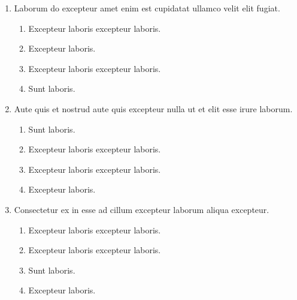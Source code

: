 \documentclass[a4paper,12pt]{article}
\begin{document}
\begin{enumerate}[label=\textbf{\arabic*.}]
\begin{multicols}{2}
\end{multicols}
\item Laborum do excepteur amet enim est cupidatat ullamco velit elit fugiat.
\begin{multicols}{2}
	\begin{enumerate}
		\item  Excepteur laboris excepteur laboris.
    
		\item  Excepteur laboris.
    
		\item  Excepteur laboris excepteur laboris.
  
		\item  Sunt laboris.
    
	\end{enumerate}

\end{multicols}
\item Aute quis et nostrud aute quis excepteur nulla ut et elit esse irure laborum.
\begin{multicols}{2}
	\begin{enumerate}
		\item  Sunt laboris.
    
		\item  Excepteur laboris excepteur laboris.
  
		\item  Excepteur laboris excepteur laboris.
    
		\item  Excepteur laboris.
    
	\end{enumerate}

\end{multicols}
\item Consectetur ex in esse ad cillum excepteur laborum aliqua excepteur.
\begin{multicols}{2}
	\begin{enumerate}
		\item  Excepteur laboris excepteur laboris.
  
		\item  Excepteur laboris excepteur laboris.
    
		\item  Sunt laboris.
    
		\item  Excepteur laboris.
    
	\end{enumerate}


\end{multicols}
\end{enumerate}
\end{document}
